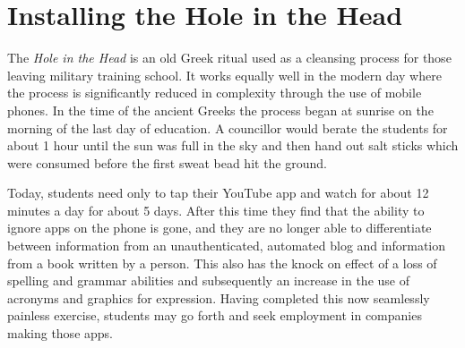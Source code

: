 
\chapter{Installing the Hole in the Head}

The {\em Hole in the Head} is an old Greek ritual used as a cleansing process for those leaving military training school. It works equally well in the modern day where the process is significantly reduced in complexity through the use of mobile phones. In the time of the ancient Greeks the process began at sunrise on the morning of the last day of education. A councillor would berate the students for about 1 hour until the sun was full in the sky and then hand out salt sticks which were consumed before the first sweat bead hit the ground.  

Today, students need only to tap their YouTube app and watch for about 12 minutes a day for about 5 days. After this time they find that the ability to ignore apps on the phone is gone, and they are no longer able to differentiate between information from an unauthenticated, automated blog and information from a book written by a person. This also has the knock on effect of a loss of spelling and grammar abilities and subsequently an increase in the use of acronyms and graphics for expression. Having completed this now seamlessly painless exercise, students may go forth and seek employment in companies making those apps. 